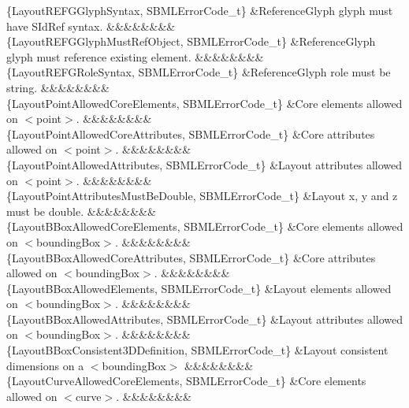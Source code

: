 \begin{DoxyParagraph}{}
\begin{longtabu}
\{Layout\+R\+E\+F\+G\+Glyph\+Syntax, S\+B\+M\+L\+Error\+Code\+\_\+t\} &Reference\+Glyph \textquotesingle{}glyph\textquotesingle{} must have S\+Id\+Ref syntax. &&&&&&&&\\
\{Layout\+R\+E\+F\+G\+Glyph\+Must\+Ref\+Object, S\+B\+M\+L\+Error\+Code\+\_\+t\} &Reference\+Glyph \textquotesingle{}glyph\textquotesingle{} must reference existing element. &&&&&&&&\\
\{Layout\+R\+E\+F\+G\+Role\+Syntax, S\+B\+M\+L\+Error\+Code\+\_\+t\} &Reference\+Glyph \textquotesingle{}role\textquotesingle{} must be string. &&&&&&&&\\
\{Layout\+Point\+Allowed\+Core\+Elements, S\+B\+M\+L\+Error\+Code\+\_\+t\} &Core elements allowed on {\ttfamily $<$point$>$}. &&&&&&&&\\
\{Layout\+Point\+Allowed\+Core\+Attributes, S\+B\+M\+L\+Error\+Code\+\_\+t\} &Core attributes allowed on {\ttfamily $<$point$>$}. &&&&&&&&\\
\{Layout\+Point\+Allowed\+Attributes, S\+B\+M\+L\+Error\+Code\+\_\+t\} &Layout attributes allowed on {\ttfamily $<$point$>$}. &&&&&&&&\\
\{Layout\+Point\+Attributes\+Must\+Be\+Double, S\+B\+M\+L\+Error\+Code\+\_\+t\} &Layout \textquotesingle{}x\textquotesingle{}, \textquotesingle{}y\textquotesingle{} and \textquotesingle{}z\textquotesingle{} must be double. &&&&&&&&\\
\{Layout\+B\+Box\+Allowed\+Core\+Elements, S\+B\+M\+L\+Error\+Code\+\_\+t\} &Core elements allowed on {\ttfamily $<$bounding\+Box$>$}. &&&&&&&&\\
\{Layout\+B\+Box\+Allowed\+Core\+Attributes, S\+B\+M\+L\+Error\+Code\+\_\+t\} &Core attributes allowed on {\ttfamily $<$bounding\+Box$>$}. &&&&&&&&\\
\{Layout\+B\+Box\+Allowed\+Elements, S\+B\+M\+L\+Error\+Code\+\_\+t\} &Layout elements allowed on {\ttfamily $<$bounding\+Box$>$}. &&&&&&&&\\
\{Layout\+B\+Box\+Allowed\+Attributes, S\+B\+M\+L\+Error\+Code\+\_\+t\} &Layout attributes allowed on {\ttfamily $<$bounding\+Box$>$}. &&&&&&&&\\
\{Layout\+B\+Box\+Consistent3\+D\+Definition, S\+B\+M\+L\+Error\+Code\+\_\+t\} &Layout consistent dimensions on a {\ttfamily $<$bounding\+Box$>$} &&&&&&&&\\
\{Layout\+Curve\+Allowed\+Core\+Elements, S\+B\+M\+L\+Error\+Code\+\_\+t\} &Core elements allowed on {\ttfamily $<$curve$>$}. &&&&&&&&\\

\end{longtabu}
\end{DoxyParagraph}
